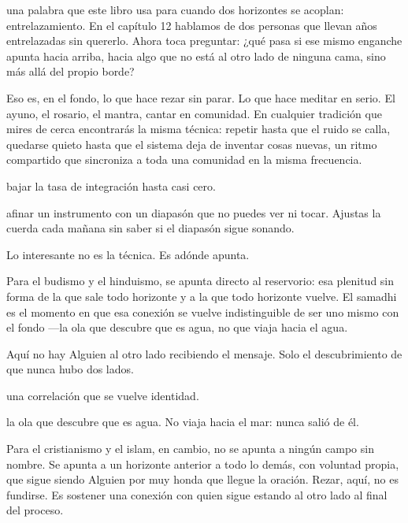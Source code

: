 \noindent {} una palabra que este libro usa para cuando dos horizontes se acoplan: entrelazamiento. En el capítulo 12 hablamos de dos personas que llevan años entrelazadas sin quererlo. Ahora toca preguntar: ¿qué pasa si ese mismo enganche apunta hacia arriba, hacia algo que no está al otro lado de ninguna cama, sino más allá del propio borde?

Eso es, en el fondo, lo que hace rezar sin parar. Lo que hace meditar en serio. El ayuno, el rosario, el mantra, cantar en comunidad. En cualquier tradición que mires de cerca encontrarás la misma técnica: repetir hasta que el ruido se calla, quedarse quieto hasta que el sistema deja de inventar cosas nuevas, un ritmo compartido que sincroniza a toda una comunidad en la misma frecuencia.

\begin{fisica}
 bajar la tasa de integración hasta casi cero.

 afinar un instrumento con un diapasón que no puedes ver ni tocar. Ajustas la cuerda cada mañana sin saber si el diapasón sigue sonando.
\end{fisica}
Lo interesante no es la técnica. Es adónde apunta.

\noindent Para el budismo y el hinduismo, se apunta directo al reservorio: esa plenitud sin forma de la que sale todo horizonte y a la que todo horizonte vuelve. El samadhi es el momento en que esa conexión se vuelve indistinguible de ser uno mismo con el fondo —la ola que descubre que es agua, no que viaja hacia el agua.

Aquí no hay Alguien al otro lado recibiendo el mensaje. Solo el descubrimiento de que nunca hubo dos lados.

\begin{fisica}
 una correlación que se vuelve identidad.

 la ola que descubre que es agua. No viaja hacia el mar: nunca salió de él.
\end{fisica}
\noindent Para el cristianismo y el islam, en cambio, no se apunta a ningún campo sin nombre. Se apunta a un horizonte anterior a todo lo demás, con voluntad propia, que sigue siendo Alguien por muy honda que llegue la oración. Rezar, aquí, no es fundirse. Es sostener una conexión con quien sigue estando al otro lado al final del proceso.

